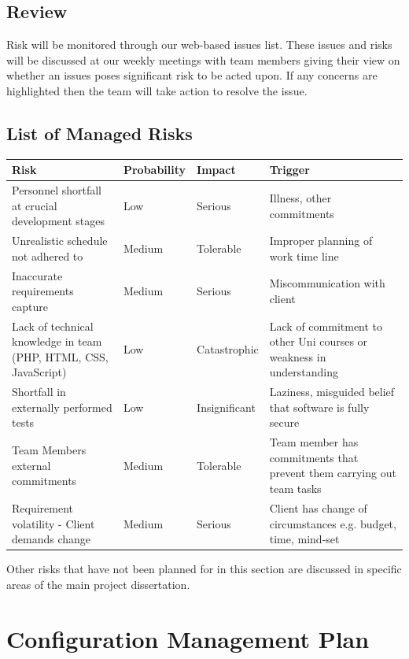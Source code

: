 \documentclass{l3proj}
\begin{document}
\subsection{Review}
Risk will be monitored through our web-based issues list. These issues and risks will be discussed at our weekly meetings with team members giving their view on whether an issues poses significant risk to be acted upon. If any concerns are highlighted then the team will take action to resolve the issue.

\subsection{List of Managed Risks}

\begin{center}
    \begin{tabular}{ | p{4cm} | l | l | p{4cm} |}
    \hline
    Risk & Probability & Impact & Trigger \\ \hline
    Personnel shortfall at crucial development stages & Low & Serious & Illness, other commitments  \\ \hline
    Unrealistic schedule not adhered to & Medium & Tolerable & Improper planning of work time line \\ \hline
    Inaccurate requirements capture & Medium & Serious & Miscommunication with client \\ \hline
    Lack of technical knowledge in team (PHP, HTML, CSS, JavaScript) & Low & Catastrophic & Lack of commitment
    to other Uni courses or weakness in understanding \\ \hline
    Shortfall in externally performed tests & Low & Insignificant & Laziness, misguided belief that software is fully secure \\ \hline
    Team Members external commitments & Medium & Tolerable & Team member has commitments that prevent them carrying out team tasks \\ \hline
    Requirement volatility - Client demands change & Medium & Serious & Client has change of circumstances e.g. budget, time, mind-set \\ 
    \hline
    \end{tabular}
\end{center}

Other risks that have not been planned for in this section are discussed in specific areas of the main project dissertation.

\section{Configuration Management Plan}
\label{sect:conf-man}
\end{document}
